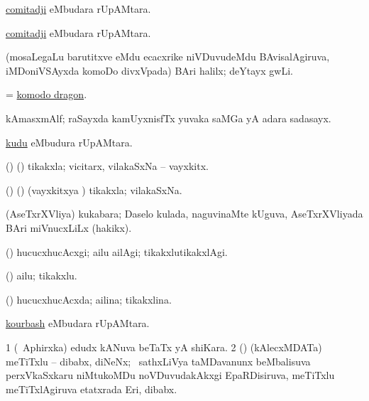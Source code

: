 \bentry
{}
\gl{\nA}
\bmng
\hyperref{kandict_c.pdf}{C}{comitadji}{comitadji} eMbudara rUpAMtara. 
\emng
\eentry


\bentry
{}
\gl{\nA}
\bmng
\hyperref{kandict_c.pdf}{C}{comitadji}{comitadji} eMbudara rUpAMtara. 
\emng
\eentry

\bentry
{}
\gl{\nA}
\bmng
(mosaLegaLu barutitxve eMdu ecacxrike niVDuvudeMdu BAvisalAgiruva, iMDoniVSAyxda komoDo divxVpada) BAri halilx; deYtayx gwLi. 
\emng
\eentry

\bentry
{}
\gl{\nA}
\bmng
 = \hyperlink{komodo dragon}{komodo dragon}. 
\emng
\eentry

\bentry
{}
\gl{\nA}
\bmng
kAmasxmAlf; raSayxda kamUyxnisfTx yuvaka saMGa yA adara sadasayx. 
\emng
\eentry

\bentry
{}
\gl{\nA}
\bmng
 \hyperlink{kudu}{kudu} eMbudura rUpAMtara. 
\emng
\eentry

\bentry
{}
\gl{\nA}
\bmng
(\ame) (\ashi) tikakxla; vicitarx, vilakaSxNa -- vayxkitx. 
\emng
\eentry

\bentry
{}
\gl{\gu}
\bmng
(\ame) (\ashi) (vayxkitxya \vi) tikakxla; vilakaSxNa. 
\emng
\eentry

\bentry
{}
\gl{\nA}
\bmng
(AseTxrXVliya) kukabara; Daselo kulada, naguvinaMte kUguva, AseTxrXVliyada BAri miVnucxLiLx (hakikx). 
\emng
\eentry

\bentry
{}
\gl{\kirxvi}
\bmng
(\ashi) hucucxhucAcxgi; ailu ailAgi; tikakxlutikakxlAgi. 
\emng
\eentry

\bentry
{}
\gl{\nA}
\bmng
(\ashi) ailu; tikakxlu. 
\emng
\eentry

\bentry
{}
\gl{\gu}
\bmng
(\ashi) hucucxhucAcxda; ailina; tikakxlina. 
\emng
\eentry

\bentry
{}
\gl{\nA}
\bmng
 \hyperlink{kourbash}{kourbash} eMbudara rUpAMtara. 
\emng
\eentry

\bentry
{}
\gl{\nA}
\bmng
\bnum
\num{1} (\da\ Aphirxka) edudx kANuva beTaTx yA shiKara. 
\num{2} () (kAlecxMDATa) meTiTxlu -- dibabx, diNeNx; \kanmu\ sathxLiVya taMDavanunx beMbalisuva perxVkaSxkaru niMtukoMDu noVDuvudakAkxgi EpaRDisiruva, meTiTxlu meTiTxlAgiruva etatxrada Eri, dibabx. 
\enum
\emng
\eentry

